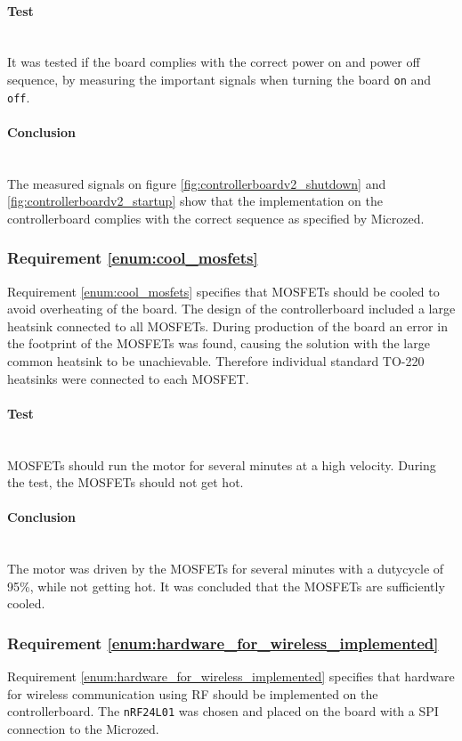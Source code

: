 \paragraph{Test}~\\
It was tested if the board complies with the correct power on and power off sequence, by measuring the important signals when turning the board \texttt{on} and \texttt{off}.

\paragraph{Conclusion}~\\
The measured signals on figure \ref{fig:controllerboardv2_shutdown} and \ref{fig:controllerboardv2_startup} show that the implementation on the controllerboard complies with the correct sequence as specified by Microzed.


\subsubsection{Requirement \ref{enum:cool_mosfets}} %
\label{ssub:requirement_ref_enum:cool_mosfets}
Requirement \ref{enum:cool_mosfets} specifies that MOSFETs should be cooled to avoid overheating of the board. 
The design of the controllerboard included a large heatsink connected to all MOSFETs. 
During production of the board an error in the footprint of the MOSFETs was found, causing the solution with the large common heatsink to be unachievable.
Therefore individual standard TO-220 heatsinks were connected to each MOSFET.

\paragraph{Test}~\\
MOSFETs should run the motor for several minutes at a high velocity. 
During the test, the MOSFETs should not get hot.

\paragraph{Conclusion}~\\
The motor was driven by the MOSFETs for several minutes with a dutycycle of 95\%, while not getting hot.
It was concluded that the MOSFETs are sufficiently cooled.

\subsubsection{Requirement \ref{enum:hardware_for_wireless_implemented}} %
\label{ssub:requirement_enum:hardware_for_wireless_implemented}
Requirement \ref{enum:hardware_for_wireless_implemented} specifies that hardware for wireless communication using RF should be implemented on the controllerboard.
The \texttt{nRF24L01} was chosen and placed on the board with a SPI connection to the Microzed.

